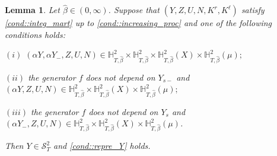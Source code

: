 \documentclass[10pt]{article} %
\newtheorem{lemma}[theorem]{Lemma}
\newcommand\cS{\mathcal S}
\def \H{\mathbb{H}}
\newcommand{\1}{\mathbf{1}}
\begin{document}
\begin{lemma}\label{lem::cond_repre}
	Let $\hat\beta \in (0,\infty)$. Suppose that $(Y,Z,U,N,K^r,K^\ell)$ satisfy \ref{cond::integ_mart} up to \ref{cond::increasing_proc} and one of the following conditions holds:
	
	\medskip
	$(i)$ $(\alpha Y,\alpha Y_-,Z,U,N) \in \H^2_{T,\hat\beta} \times \H^2_{T,\hat\beta} \times \H^2_{T,\hat\beta}(X) \times \H^2_{T,\hat\beta}(\mu);$
	
	\medskip
	$(ii)$ the generator $f$ does not depend on $Y_{s-}$ and $(\alpha Y,Z,U,N) \in \H^2_{T,\hat\beta} \times \H^2_{T,\hat\beta}(X) \times \H^2_{T,\hat\beta}(\mu);$
	
	\medskip
	$(iii)$ the generator $f$ does not depend on $Y_s$ and $(\alpha Y_-,Z,U,N) \in \H^2_{T,\hat\beta} \times \H^2_{T,\hat\beta}(X) \times \H^2_{T,\hat\beta}(\mu)$.
	
	\medskip
	Then $Y \in \cS^2_T$ and \ref{cond::repre_Y} holds.
\end{lemma}
\end{document}
